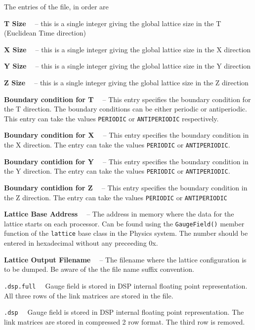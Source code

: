 The entries of the file, in order are
\begin{description}
\item{\bf T Size \ } -- this is a single integer giving the global lattice size in the T (Euclidean Time direction)
\item{\bf X Size \ } -- this is a single integer giving the global lattice size in the X direction
\item{\bf Y Size \ } -- this is a single integer giving the global lattice size in the Y direction
\item{\bf Z Size \ } -- this is a single integer giving the global lattice size in the Z direction
\item{\bf Boundary condition for T \ } -- This entry specifies the boundary condition for the T direction. The boundary conditions can be either periodic or
antiperiodic. This entry can take the values {\tt PERIODIC} or {\tt ANTIPERIODIC} respectively.
\item{\bf Boundary condition for X \ } -- This entry specifies the boundary condition in the X direction.  The entry can take the values {\tt PERIODIC} or {\tt ANTIPERIODIC}.
\item{\bf Boundary contidion for Y \ } -- This entry specifies the boundary condition in the Y direction.  The entry can take the values {\tt PERIODIC} or {\tt ANTIPERIODIC}.
\item{\bf Boundary contidion for Z \ }  -- This entry specifies the boundary condition in the Z direction.  The entry can take the values {\tt PERIODIC} or {\tt ANTIPERIODIC}
\item{\bf Lattice Base Address \ } -- The address in memory where the data
for the lattice starts on each processor. Can be found using the {\tt GaugeField()} member function of the {\tt lattice} base class in the Physics system. The number should be entered in hexadecimal without any preceeding 0x.
\item{\bf Lattice Output Filename \ } -- The filename where the lattice
configuration is to be dumped. Be aware of the the file name suffix convention.
\begin{description} 
\item{ \tt .dsp.full \ } Gauge field is stored  in DSP internal floating point representation. All three rows of the link matrices are stored in the file.
\item{ \tt .dsp  \ } Gauge field  is stored in DSP internal floating point representation. The link matrices are stored in compressed 2 row format. The third row is removed.

\end{description}
\end{description}
